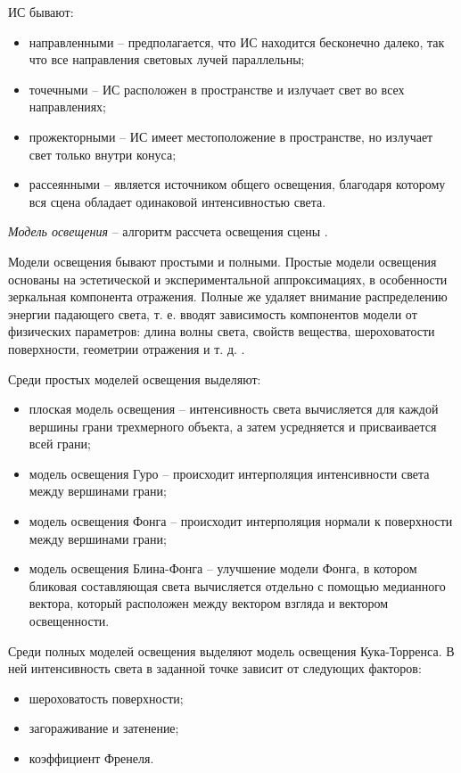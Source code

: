 ИС бывают:

\begin{itemize}
	\item направленными -- предполагается, что ИС находится бесконечно далеко, так что все направления световых лучей параллельны;
	\item точечными -- ИС расположен в пространстве и излучает свет во всех направлениях;
	\item прожекторными -- ИС имеет местоположение в пространстве, но излучает свет только внутри конуса;
	\item рассеянными -- является источником общего освещения, благодаря которому вся сцена обладает одинаковой интенсивностью света.
\end{itemize}

\textit{Модель освещения} -- алгоритм рассчета освещения сцены \cite{eberly20063d}. 

Модели освещения бывают простыми и полными. Простые модели освещения основаны на эстетической и экспериментальной аппроксимациях, в особенности зеркальная компонента отражения. Полные же удаляет внимание распределению энергии падающего света, т. е. вводят зависимость компонентов модели от физических параметров: длина волны света, свойств вещества, шероховатости поверхности, геометрии отражения и т. д. \cite{rogers}.

Среди простых моделей освещения выделяют:

\begin{itemize}
	\item плоская модель освещения -- интенсивность света вычисляется для каждой вершины грани трехмерного объекта, а затем усредняется и присваивается всей грани;
	\item модель освещения Гуро -- происходит интерполяция интенсивности света между вершинами грани;
	\item модель освещения Фонга -- происходит интерполяция нормали к поверхности между вершинами грани;
	\item модель освещения Блина-Фонга -- улучшение модели Фонга, в котором бликовая составляющая света вычисляется отдельно с помощью медианного вектора, который расположен между вектором взгляда и вектором освещенности.
\end{itemize}

Среди полных моделей освещения выделяют модель освещения Кука-Торренса. В ней интенсивность света в заданной точке зависит от следующих факторов:

\begin{itemize}
	\item шероховатость поверхности;
	\item загораживание и затенение;
	\item коэффициент Френеля.
\end{itemize}

